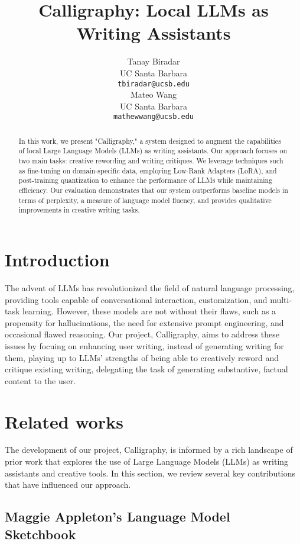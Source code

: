 \documentclass{article}
\title{Calligraphy: Local LLMs as Writing Assistants}
\author{%
  Tanay Biradar\\
  UC Santa Barbara\\
  \texttt{tbiradar@ucsb.edu} \\
  \And
  Mateo Wang\\
  UC Santa Barbara\\
  \texttt{mathewwang@ucsb.edu} \\
}
\begin{document}
\maketitle


\begin{abstract}
  In this work, we present "Calligraphy," a system designed to augment the
  capabilities of local Large Language Models (LLMs) as writing assistants.
  Our approach focuses on two main tasks: creative rewording and writing
  critiques. We leverage techniques such as fine-tuning on domain-specific
  data, employing Low-Rank Adapters (LoRA), and post-training quantization to
  enhance the performance of LLMs while maintaining efficiency. Our
  evaluation demonstrates that our system outperforms baseline models in
  terms of perplexity, a measure of language model fluency, and provides
  qualitative improvements in creative writing tasks.
\end{abstract}


\section{Introduction}


The advent of LLMs has revolutionized the field of natural language processing,
providing tools capable of conversational interaction, customization, and
multi-task learning. However, these models are not without their flaws, such as a
propensity for hallucinations, the need for extensive prompt engineering, and
occasional flawed reasoning. Our project, Calligraphy, aims to address these issues
by focuing on enhancing user writing, instead of generating writing for them,
playing up to LLMs' strengths of being able to creatively reword and critique
existing writing, delegating the task of generating substantive, factual content to
the user.


\section{Related works}
\label{rel_works}

The development of our project, Calligraphy, is informed by a rich landscape of
prior work that explores the use of Large Language Models (LLMs) as writing
assistants and creative tools. In this section, we review several key
contributions that have influenced our approach.

\subsection{Maggie Appleton's Language Model Sketchbook}
\end{document}

